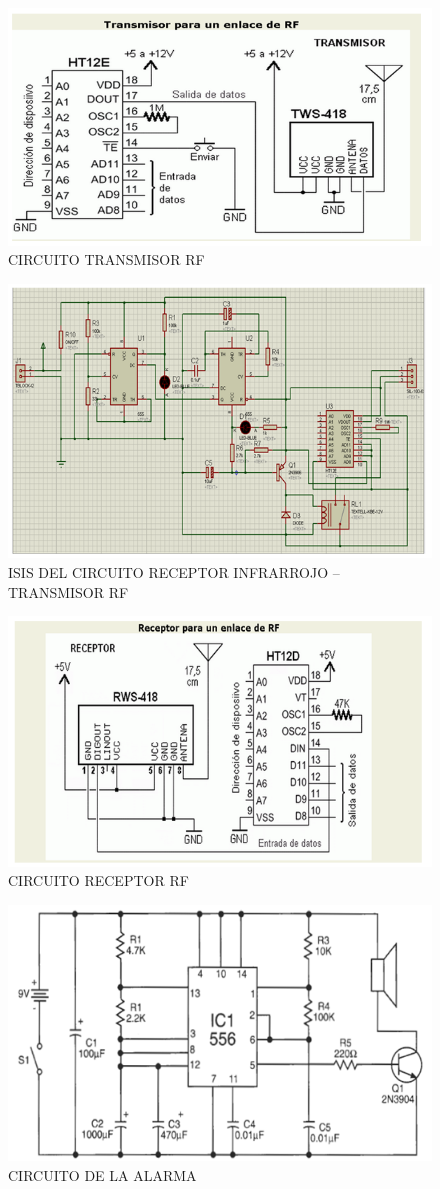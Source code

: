 \documentclass[a4paper,11pt]{article}
\begin{document}
	\begin{figure}[h]
		\caption{CIRCUITO TRANSMISOR RF}
		\centering
		\includegraphics[width=0.6\linewidth]{./13}
	\end{figure}	
	\newpage
	\begin{figure}[h]
		\caption{ISIS DEL CIRCUITO RECEPTOR INFRARROJO – TRANSMISOR RF}
		\centering
		\includegraphics[width=0.6\linewidth]{./14}
	\end{figure}
%
	\begin{figure}[h]
		\caption{CIRCUITO RECEPTOR RF }
		\centering
		\includegraphics[width=0.6\linewidth]{./15}
	\end{figure}
%
	\begin{figure}[h]
		\caption{CIRCUITO DE LA ALARMA}
		\centering
		\includegraphics[width=0.6\linewidth]{./16}
	\end{figure}
\end{document}

